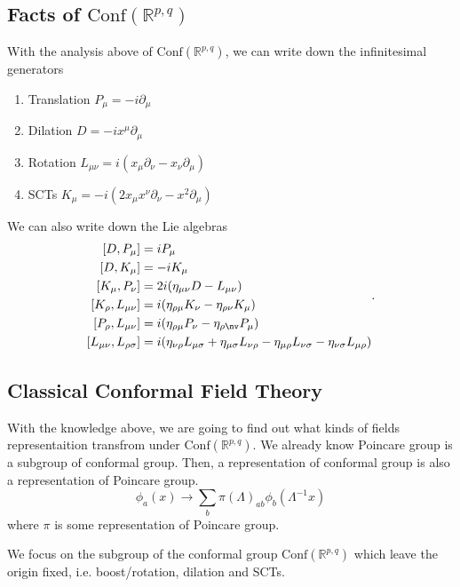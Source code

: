 \documentclass[a4paper,11pt]{article}
\begin{document}
\subsection{Facts of $\mathrm{Conf}(\mathbb{R}^{p,q})$}
With the analysis above of $\mathrm{Conf}(\mathbb{R}^{p,q})$, we can write down the infinitesimal generators
\begin{enumerate}
    \item Translation $P_\mu=-i\partial_\mu$
    \item Dilation $D=-ix^\mu\partial_\mu$
    \item Rotation $L_{\mu\nu}=i(x_\mu\partial_\nu-x_\nu\partial_\mu)$
    \item SCTs $K_\mu=-i(2x_\mu x^\nu\partial_\nu-x^2\partial_\mu)$
\end{enumerate}
We can also write down the Lie algebras
\begin{equation}
\begin{aligned}
\left[D,P_\mu\right]&=iP_\mu\\
\left[D,K_\mu\right]&=-iK_\mu\\
\left[K_\mu,P_\nu\right]&=2i(\eta_{\mu\nu}D-L_{\mu\nu})\\
\left[K_\rho,L_{\mu\nu}\right]&=i(\eta_{\rho\mu}K_{\nu}-\eta_{\rho\nu}K_\mu)\\
\left[P_\rho,L_{\mu\nu}\right]&=i(\eta_{\rho\mu}P_\nu-\eta_{\rho\nv}P_\mu)\\
\left[L_{\mu\nu},L_{\rho\sigma}\right]&=i(\eta_{\nu\rho}L_{\mu\sigma}+\eta_{\mu\sigma}L_{\nu\rho}-\eta_{\mu\rho}L_{\nu\sigma}-\eta_{\nu\sigma}L_{\mu\rho})
\end{aligned}.
\end{equation}
\subsection{Classical Conformal Field Theory}
With the knowledge above, we are going to find out what kinds of fields representaition transfrom under $\mathrm{Conf}(\mathbb{R}^{p,q})$. We already know Poincare group is a subgroup of conformal group. Then, a representation of conformal group is also a representation of Poincare group.
\begin{equation}
    \phi_a(x)\rightarrow\sum_b\pi(\Lambda)_{ab}\phi_b(\Lambda^{-1}x)
\end{equation}
where $\pi$ is some representation of Poincare group.

We focus on the subgroup of the conformal group $\mathrm{Conf}(\mathbb{R}^{p,q})$ which leave the origin fixed, i.e. boost/rotation, dilation and SCTs.
\end{document}
